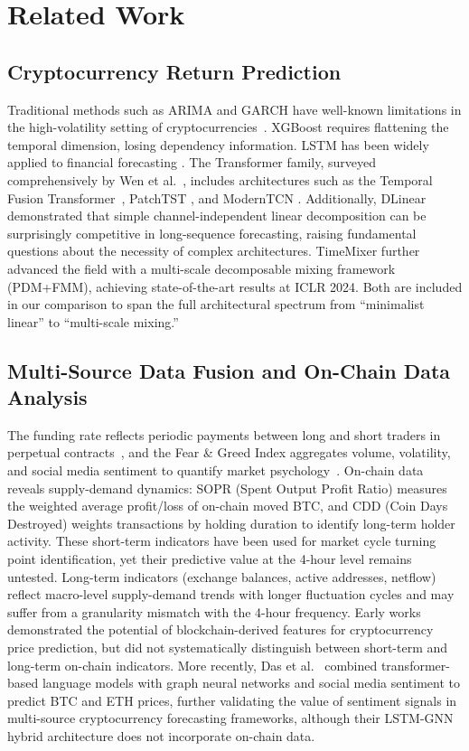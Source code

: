 \documentclass[a4paper]{cas-dc}
\begin{document}
\section{Related Work}

\subsection{Cryptocurrency Return Prediction}

Traditional methods such as ARIMA and GARCH have well-known limitations in the high-volatility setting of cryptocurrencies~\cite{catania2019,kristoufek2015}. XGBoost \cite{chen2016} requires flattening the temporal dimension, losing dependency information. LSTM \cite{hochreiter1997} has been widely applied to financial forecasting \cite{mcnally2018}. The Transformer family, surveyed comprehensively by Wen et al.~\cite{wen2023}, includes architectures such as the Temporal Fusion Transformer~\cite{lim2021}, PatchTST \cite{nie2023}, and ModernTCN \cite{luo2024}. Additionally, DLinear \cite{zeng2023} demonstrated that simple channel-independent linear decomposition can be surprisingly competitive in long-sequence forecasting, raising fundamental questions about the necessity of complex architectures. TimeMixer \cite{wang2024timemixer} further advanced the field with a multi-scale decomposable mixing framework (PDM+FMM), achieving state-of-the-art results at ICLR 2024. Both are included in our comparison to span the full architectural spectrum from ``minimalist linear'' to ``multi-scale mixing.''

\subsection{Multi-Source Data Fusion and On-Chain Data Analysis}

The funding rate reflects periodic payments between long and short traders in perpetual contracts~\cite{malik2023}, and the Fear \& Greed Index aggregates volume, volatility, and social media sentiment to quantify market psychology~\cite{carosia2024}. On-chain data reveals supply-demand dynamics: SOPR (Spent Output Profit Ratio) measures the weighted average profit/loss of on-chain moved BTC, and CDD (Coin Days Destroyed) weights transactions by holding duration to identify long-term holder activity. These short-term indicators have been used for market cycle turning point identification, yet their predictive value at the 4-hour level remains untested. Long-term indicators (exchange balances, active addresses, netflow) reflect macro-level supply-demand trends with longer fluctuation cycles and may suffer from a granularity mismatch with the 4-hour frequency. Early works~\cite{alessandretti2018} demonstrated the potential of blockchain-derived features for cryptocurrency price prediction, but did not systematically distinguish between short-term and long-term on-chain indicators. More recently, Das et al.~\cite{das2026} combined transformer-based language models with graph neural networks and social media sentiment to predict BTC and ETH prices, further validating the value of sentiment signals in multi-source cryptocurrency forecasting frameworks, although their LSTM-GNN hybrid architecture does not incorporate on-chain data.
\end{document}
